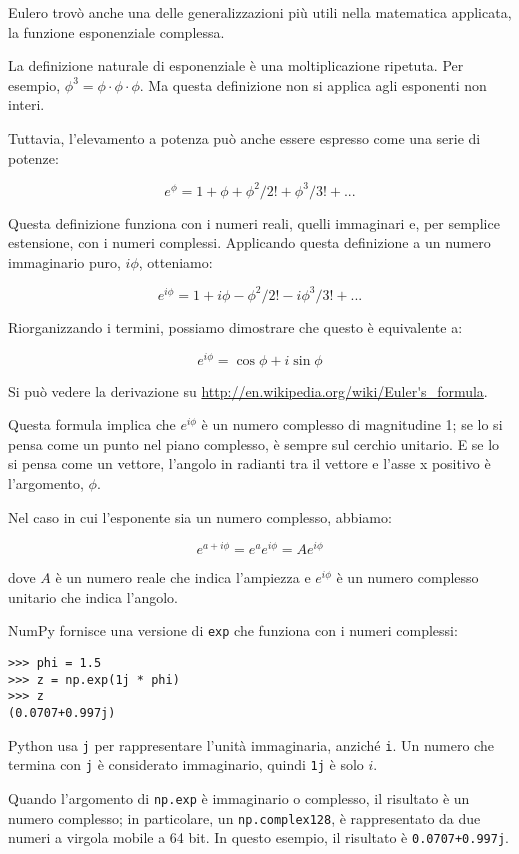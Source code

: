 \documentclass[12pt,a4paper]{book}
\begin{document}
Eulero trovò anche una delle generalizzazioni più utili nella matematica applicata, la funzione esponenziale complessa.

La definizione naturale di esponenziale è una moltiplicazione ripetuta. Per esempio, $\phi^3 = \phi \cdot \phi \cdot \phi$. Ma questa definizione non si applica agli esponenti non interi.

Tuttavia, l'elevamento a potenza può anche essere espresso come una serie di potenze:

%
\[ e^\phi = 1 + \phi + \phi^2/2! + \phi^3/3! + ... \] 

%
Questa definizione funziona con i numeri reali, quelli immaginari e, per semplice estensione, con i numeri complessi. Applicando questa definizione a un numero immaginario puro, $i\phi$, otteniamo:

%
\[ e^{i\phi} = 1 + i\phi - \phi^2/2! - i\phi^3/3! + ... \] 

%
Riorganizzando i termini, possiamo dimostrare che questo è equivalente a:

%
\[ e^{i\phi} = \cos \phi + i \sin \phi \] 

%
Si può vedere la derivazione su \url{http://en.wikipedia.org/wiki/Euler's_formula}.

Questa formula implica che $e^{i\phi}$ è un numero complesso di magnitudine 1; se lo si pensa come un punto nel piano complesso, è sempre sul cerchio unitario. E se lo si pensa come un vettore, l'angolo in radianti tra il vettore e l'asse x positivo è l'argomento, $\phi$.

Nel caso in cui l'esponente sia un numero complesso, abbiamo:

%
\[ e^{a + i\phi} = e^a e^{i\phi} = A e^{i\phi} \] 

%
dove $A$ è un numero reale che indica l'ampiezza e $e^{i\phi}$ è un numero complesso unitario che indica l'angolo.

NumPy fornisce una versione di {\tt exp} che funziona con i numeri complessi:

\begin{verbatim} 
>>> phi = 1.5
>>> z = np.exp(1j * phi)
>>> z
(0.0707+0.997j)
 \end{verbatim} 

Python usa {\tt j} per rappresentare l'unità immaginaria, anziché {\tt i}. Un numero che termina con {\tt j} è considerato immaginario, quindi {\tt 1j} è solo $i$.

Quando l'argomento di {\tt np.exp} è immaginario o complesso, il risultato è un numero complesso; in particolare, un {\tt np.complex128}, è rappresentato da due numeri a virgola mobile a 64 bit. In questo esempio, il risultato è {\tt 0.0707+0.997j}.
\end{document}
